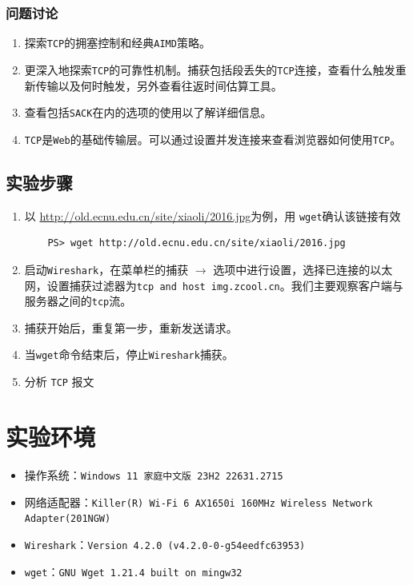 \documentclass{article}
\begin{document}
\subsubsection{问题讨论}

\begin{enumerate}[noitemsep]
  \item 探索\texttt{TCP}的拥塞控制和经典\texttt{AIMD}策略。
  \item 更深入地探索\texttt{TCP}的可靠性机制。捕获包括段丢失的\texttt{TCP}连接，查看什么触发重新传输以及何时触发，另外查看往返时间估算工具。
  \item 查看包括\texttt{SACK}在内的选项的使用以了解详细信息。
  \item \texttt{TCP}是\texttt{Web}的基础传输层。可以通过设置并发连接来查看浏览器如何使用\texttt{TCP}。
\end{enumerate}


\subsection{实验步骤}

\begin{enumerate}[noitemsep]
  \item 以 \url{http://old.ecnu.edu.cn/site/xiaoli/2016.jpg}为例，用 \texttt{wget}确认该链接有效
  \begin{lstlisting}
    PS> wget http://old.ecnu.edu.cn/site/xiaoli/2016.jpg
  \end{lstlisting}
  \item 启动\texttt{Wireshark}，在菜单栏的捕获 \( \to \) 选项中进行设置，选择已连接的以太网，设置捕获过滤器为\texttt{tcp and host img.zcool.cn}。我们主要观察客户端与服务器之间的\texttt{tcp}流。
  \item 捕获开始后，重复第一步，重新发送请求。
  \item 当\texttt{wget}命令结束后，停止\texttt{Wireshark}捕获。
  \item 分析 \texttt{TCP} 报文
\end{enumerate}

\section{实验环境}


\begin{itemize}[noitemsep]
  \item 操作系统：\texttt{Windows 11 家庭中文版 23H2 22631.2715}
  \item 网络适配器：\texttt{Killer(R) Wi-Fi 6 AX1650i 160MHz Wireless Network Adapter(201NGW)}
  \item \texttt{Wireshark}：\texttt{Version 4.2.0 (v4.2.0-0-g54eedfc63953)}
  \item \texttt{wget}：\texttt{GNU Wget 1.21.4 built on mingw32}
\end{itemize}
\end{document}
